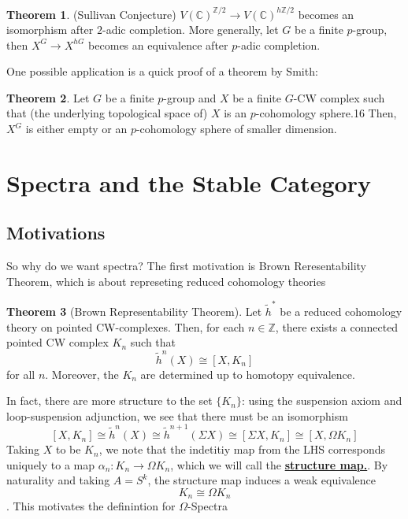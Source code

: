 \documentclass{article}
\theoremstyle{definition}
\newtheorem{theorem}{Theorem}[section]
\theoremstyle{definition}
\theoremstyle{definition}
\theoremstyle{definition}
\theoremstyle{definition}
\theoremstyle{definition}
\theoremstyle{definition}
\begin{document}
\begin{tcolorbox}[colback=red!5!white,colframe=red!30!white]
\begin{theorem}
(Sullivan Conjecture) $V(\mathbb{C})^{\mathbb{Z}/2}\to V(\mathbb{C})^{h \mathbb{Z}/2}$ becomes an isomorphism after $2$-adic completion. More generally, let $G$ be a finite $p$-group, then $X^G\to X^{hG}$ becomes an equivalence after $p$-adic completion. 
\end{theorem}
\end{tcolorbox}




One possible application is a quick proof of a theorem by Smith: 


\begin{tcolorbox}[colback=red!5!white,colframe=red!30!white]
\begin{theorem}
    Let $G$ be a finite $p$-group and $X$ be a finite $G$-CW complex such that (the underlying topological space of) $X$ is an $p$-cohomology sphere.16 Then, $X^G$ is either empty or an $p$-cohomology sphere of smaller dimension.
\end{theorem}
\end{tcolorbox}











\section{Spectra and the Stable Category}
\subsection{Motivations}
So why do we want spectra? The first motivation is Brown Reresentability Theorem, which is about represeting reduced cohomology theories 

\begin{tcolorbox}[colback=red!5!white,colframe=red!30!white]
\begin{theorem}[Brown Representability Theorem]
Let $\tilde{h}^*$ be a reduced cohomology theory on pointed CW-complexes. Then, for each $n\in \mathbb{Z}$, there exists a connected pointed CW complex $K_n$ such that 
\[\tilde{h}^n(X)\cong [X,K_n]\]
for all $n$. Moreover, the $K_n$ are determined up to homotopy equivalence. 
\end{theorem}
\end{tcolorbox}
In fact, there are more structure to the set $\{K_n\}$: using the suspension axiom and loop-suspension adjunction, we see that there must be an isomorphism 
\[[X,K_n]\cong \tilde{h}^n(X)\cong \tilde{h}^{n+1}(\Sigma X)\cong [\Sigma X,K_n]\cong [X,\Omega K_n]\]
Taking $X$ to be $K_n$, we note that the indetitiy map from the LHS corresponds uniquely to a map $\alpha_n: K_n\to \Omega K_n$, which we will call the \underline{\textbf{structure map.}}. By naturality and taking $A=S^k$, the structure map induces a weak equivalence 
\[K_n\cong  \Omega K_n\]
. This motivates the definintion for $\Omega$-Spectra
\end{document}
